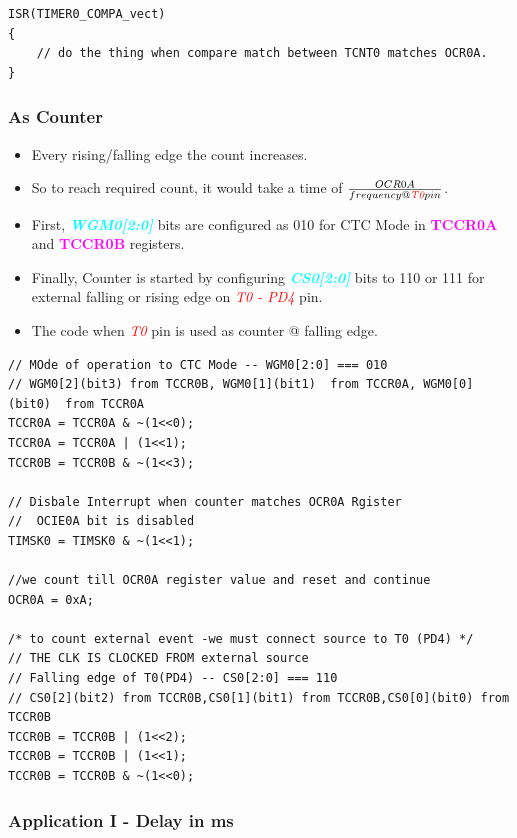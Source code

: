 \documentclass{article}
\newcommand{\bitFormat}[1]{\emph{\textbf{\textcolor{cyan}{#1}}}}
\newcommand{\regFormat}[1]{\textbf{\textcolor{magenta}{#1}}}
\newcommand{\pinFormat}[1]{\emph{\textcolor{red}{#1}}}
\begin{document}
\begin{verbatim}
ISR(TIMER0_COMPA_vect)
{
    // do the thing when compare match between TCNT0 matches OCR0A.
}
\end{verbatim}


\subsubsection{As Counter}
\begin{itemize}
    \item Every rising/falling edge the count increases.
    \item So to reach required count, it would take a time of $\frac{OCR0A}{frequency @ \pinFormat{T0} pin}$.
    \item First, \bitFormat{WGM0[2:0]} bits are configured as 010 for CTC Mode in \regFormat{TCCR0A} and \regFormat{TCCR0B} registers.
    \item Finally, Counter is started by configuring \bitFormat{CS0[2:0]} bits to 110 or 111 for external falling or rising edge on \pinFormat{T0 - PD4} pin.
    \item The code when \pinFormat{T0} pin is used as counter @ falling edge.
\end{itemize}

\begin{verbatim}
// MOde of operation to CTC Mode -- WGM0[2:0] === 010
// WGM0[2](bit3) from TCCR0B, WGM0[1](bit1)  from TCCR0A, WGM0[0](bit0)  from TCCR0A
TCCR0A = TCCR0A & ~(1<<0);
TCCR0A = TCCR0A | (1<<1);
TCCR0B = TCCR0B & ~(1<<3);
    
// Disbale Interrupt when counter matches OCR0A Rgister
//  OCIE0A bit is disabled
TIMSK0 = TIMSK0 & ~(1<<1);

//we count till OCR0A register value and reset and continue 
OCR0A = 0xA;

/* to count external event -we must connect source to T0 (PD4) */
// THE CLK IS CLOCKED FROM external source
// Falling edge of T0(PD4) -- CS0[2:0] === 110
// CS0[2](bit2) from TCCR0B,CS0[1](bit1) from TCCR0B,CS0[0](bit0) from TCCR0B
TCCR0B = TCCR0B | (1<<2);
TCCR0B = TCCR0B | (1<<1);
TCCR0B = TCCR0B & ~(1<<0);
\end{verbatim}

\subsubsection{Application I - Delay in ms}
\end{document}
